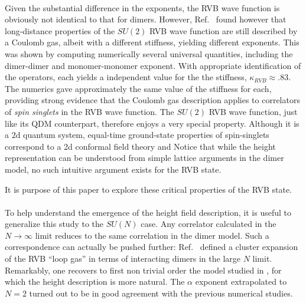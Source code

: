 \documentclass[11pt]{iopart}
\begin{document}
\paragraph{} Given the substantial difference in the exponents, the RVB wave function is obviously not identical to that for dimers. However, Ref.~\cite{RVB2} found however that long-distance properties of the $SU(2)$ RVB wave function are still described by a Coulomb gas, albeit with a different stiffness, yielding different exponents. This was shown by computing numerically several universal quantities, including the dimer-dimer and monomer-monomer exponent. With appropriate identification of the operators, each yields a independent value for the the stiffness, $\kappa_{RVB}\approx .83$. The numerics gave approximately the same value of the stiffness for each, providing strong evidence that the Coulomb gas description applies to correlators of {\em spin singlets} in the RVB wave function. The $SU(2)$ RVB wave function, just like its QDM counterpart, therefore enjoys a very special property. Although it is a $2$d quantum system, equal-time ground-state properties of spin-singlets correspond to a 2d conformal field theory\cite{QuantumLifshitz} and 
Notice that while the height representation can be understood from simple lattice arguments in the dimer model, no such intuitive argument exists for the RVB state. 

It is purpose of this paper to explore these critical properties of the RVB state.


\paragraph{}To help understand the emergence of the height field description, it is useful to generalize this study to the $SU(N)$ case. Any correlator calculated in the $N\to \infty$ limit reduces to the same correlation in the dimer model. Such a correspondence can actually be pushed further: Ref.~\cite{Damle} defined a cluster expansion of the RVB ``loop gas''\cite{Sutherland_loops} in terms of interacting dimers in the large $N$ limit. Remarkably, one recovers to first non trivial order the model studied in \cite{Alet_dimers1,Alet_dimers2}, for which the height description is more natural. The $\alpha$ exponent extrapolated to $N=2$ turned out to be in good agreement with the previous numerical studies\cite{RVB1,RVB2}.
\end{document}
